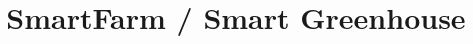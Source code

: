 \documentclass{masterthesis-uc2-en}
\title{SmartFarm / Smart Greenhouse}
\begin{document}
\frontmatter
	\maketitlepage
	\pagestyle{plain}
	
	
%	
	
	
	
	\clearpage
	\renewcommand{\listfigurename}{Liste de figures}
	
	\tableofcontents
	\listoffigures
	


\mainmatter
	\pagestyle{fancy}
	
	
	
	
	
	

	
	
%	
%	

	
\backmatter
	
	
\end{document}
